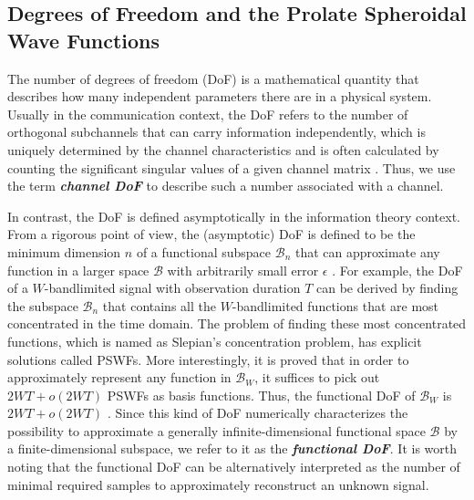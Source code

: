\documentclass[journal,twocolumn]{IEEEtran}
\begin{document}


\subsection{Degrees of Freedom and the Prolate Spheroidal Wave Functions}
\label{Sec_2_Subsec_1}
The number of degrees of freedom (DoF) is a mathematical quantity that describes how many independent parameters there are in a physical system. 
Usually in the communication context, the DoF refers to the number of orthogonal subchannels that can carry information independently, which is uniquely determined by the channel characteristics and is often calculated by counting the significant singular values of a given channel matrix \cite{goldsmith2003capacity}. 
Thus, we use the term {\textbf{\emph{channel DoF}}} to describe such a number associated with a channel.

In contrast, the DoF is defined asymptotically in the information theory context. From a rigorous point of view, the (asymptotic) DoF is defined to be the minimum dimension $n$ of a functional subspace $\mathcal{B}_n$ that can approximate any function in a larger space $\mathcal{B}$ with arbitrarily small error $\epsilon$ \cite{poon2005degrees}. For example, the DoF of a $W$-bandlimited signal with observation duration $T$ can be derived by finding the subspace $\mathcal{B}_n$ that contains all the $W$-bandlimited functions that are most concentrated in the time domain. The problem of finding these most concentrated functions, which is named as Slepian's concentration problem, has explicit solutions called PSWFs.
More interestingly, it is proved that in order to approximately represent any function in $\mathcal{B}_W$, it suffices to pick out $2WT+o(2WT)$ PSWFs as basis functions. Thus, the functional DoF of $\mathcal{B}_W$ is $2WT+o(2WT)$ \cite{slepian1976bandwidth}. 
Since this kind of DoF numerically characterizes the possibility to approximate a generally infinite-dimensional functional space $\mathcal{B}$ by a finite-dimensional subspace, we refer to it as the {\textbf{\emph{functional DoF}}}. 
It is worth noting that the functional DoF can be alternatively interpreted as the number of minimal required samples to approximately reconstruct an unknown signal. 
\end{document}
